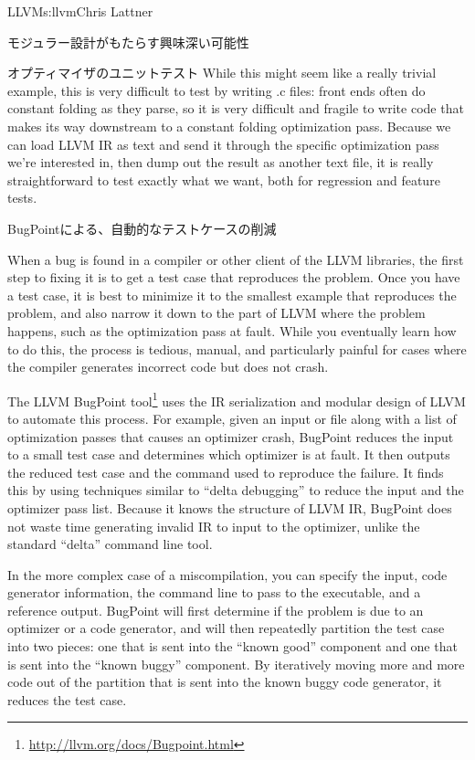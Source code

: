 \begin{aosachapter}{LLVM}{s:llvm}{Chris Lattner}
\begin{aosasect1}{モジュラー設計がもたらす興味深い可能性}
\begin{aosasect2}{オプティマイザのユニットテスト}
While this might seem like a really trivial example, this is very
difficult to test by writing .c files: front ends often do constant
folding as they parse, so it is very difficult and fragile to write
code that makes its way downstream to a constant folding optimization
pass.  Because we can load LLVM IR as text and send it through the
specific optimization pass we're interested in, then dump out the
result as another text file, it is really straightforward to test
exactly what we want, both for regression and feature tests.

\end{aosasect2}

\begin{aosasect2}{BugPointによる、自動的なテストケースの削減}

When a bug is found in a compiler or other client of the LLVM
libraries, the first step to fixing it is to get a test case that
reproduces the problem.  Once you have a test case, it is best to
minimize it to the smallest example that reproduces the problem, and
also narrow it down to the part of LLVM where the problem happens,
such as the optimization pass at fault.  While you eventually learn
how to do this, the process is tedious, manual, and particularly
painful for cases where the compiler generates incorrect code but does
not crash.

The LLVM BugPoint
tool\footnote{\url{http://llvm.org/docs/Bugpoint.html}} uses the IR
serialization and modular design of LLVM to automate this process.
For example, given an input  or  file along with a
list of optimization passes that causes an optimizer crash, BugPoint
reduces the input to a small test case and determines which optimizer
is at fault.  It then outputs the reduced test case and the 
command used to reproduce the failure.  It finds this by using
techniques similar to ``delta debugging'' to reduce the input and the
optimizer pass list.  Because it knows the structure of LLVM IR,
BugPoint does not waste time generating invalid IR to input to the
optimizer, unlike the standard ``delta'' command line tool.

In the more complex case of a miscompilation, you can specify the
input, code generator information, the command line to pass to the
executable, and a reference output. BugPoint will first determine if
the problem is due to an optimizer or a code generator, and will then
repeatedly partition the test case into two pieces: one that is sent
into the ``known good'' component and one that is sent into the
``known buggy'' component.  By iteratively moving more and more code
out of the partition that is sent into the known buggy code generator,
it reduces the test case.


\end{aosasect2}
\end{aosasect1}
\end{aosachapter}
